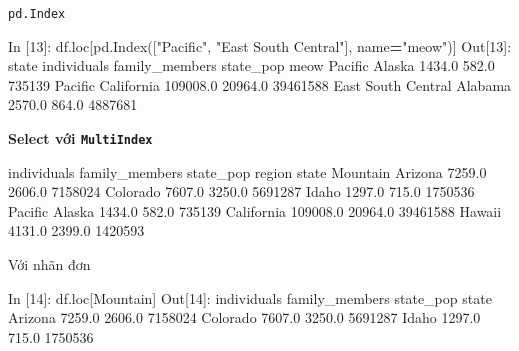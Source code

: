 \documentclass[
]{book}
\newenvironment{Shaded}{\begin{snugshade}}{\end{snugshade}}
\newcommand{\DecValTok}[1]{\textcolor[rgb]{0.00,0.00,0.81}{#1}}
\newcommand{\FloatTok}[1]{\textcolor[rgb]{0.00,0.00,0.81}{#1}}
\newcommand{\NormalTok}[1]{#1}
\newcommand{\OperatorTok}[1]{\textcolor[rgb]{0.81,0.36,0.00}{\textbf{#1}}}
\newcommand{\StringTok}[1]{\textcolor[rgb]{0.31,0.60,0.02}{#1}}
\begin{document}
\texttt{pd.Index}

\begin{Shaded}
\begin{Highlighting}[]
\NormalTok{In [}\DecValTok{13}\NormalTok{]: df.loc[pd.Index([}\StringTok{"Pacific"}\NormalTok{, }\StringTok{"East South Central"}\NormalTok{], name}\OperatorTok{=}\StringTok{"meow"}\NormalTok{)]}
\NormalTok{Out[}\DecValTok{13}\NormalTok{]:}
\NormalTok{                         state  individuals  family\_members  state\_pop}
\NormalTok{meow                                                                   }
\NormalTok{Pacific                 Alaska       }\FloatTok{1434.0}           \FloatTok{582.0}     \DecValTok{735139}
\NormalTok{Pacific             California     }\FloatTok{109008.0}         \FloatTok{20964.0}   \DecValTok{39461588}
\NormalTok{East South Central     Alabama       }\FloatTok{2570.0}           \FloatTok{864.0}    \DecValTok{4887681}
\end{Highlighting}
\end{Shaded}

\textbf{Select với \texttt{MultiIndex}}

\begin{Shaded}
\begin{Highlighting}[]
\NormalTok{                     individuals  family\_members  state\_pop}
\NormalTok{region   state                                             }
\NormalTok{Mountain Arizona          }\FloatTok{7259.0}          \FloatTok{2606.0}    \DecValTok{7158024}
\NormalTok{         Colorado         }\FloatTok{7607.0}          \FloatTok{3250.0}    \DecValTok{5691287}
\NormalTok{         Idaho            }\FloatTok{1297.0}           \FloatTok{715.0}    \DecValTok{1750536}
\NormalTok{Pacific  Alaska           }\FloatTok{1434.0}           \FloatTok{582.0}     \DecValTok{735139}
\NormalTok{         California     }\FloatTok{109008.0}         \FloatTok{20964.0}   \DecValTok{39461588}
\NormalTok{         Hawaii           }\FloatTok{4131.0}          \FloatTok{2399.0}    \DecValTok{1420593}
\end{Highlighting}
\end{Shaded}

Với nhãn đơn

\begin{Shaded}
\begin{Highlighting}[]
\NormalTok{In [}\DecValTok{14}\NormalTok{]: df.loc[}\StringTok{\textquotesingle{}Mountain\textquotesingle{}}\NormalTok{]}
\NormalTok{Out[}\DecValTok{14}\NormalTok{]: }
\NormalTok{          individuals  family\_members  state\_pop}
\NormalTok{state                                           }
\NormalTok{Arizona        }\FloatTok{7259.0}          \FloatTok{2606.0}    \DecValTok{7158024}
\NormalTok{Colorado       }\FloatTok{7607.0}          \FloatTok{3250.0}    \DecValTok{5691287}
\NormalTok{Idaho          }\FloatTok{1297.0}           \FloatTok{715.0}    \DecValTok{1750536}
\end{Highlighting}
\end{Shaded}
\end{document}
